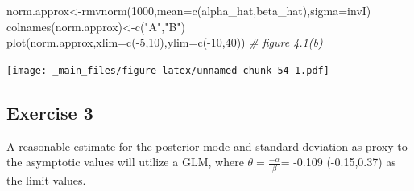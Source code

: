 \documentclass[
]{book}
\newenvironment{Shaded}{\begin{snugshade}}{\end{snugshade}}
\newcommand{\AttributeTok}[1]{\textcolor[rgb]{0.77,0.63,0.00}{#1}}
\newcommand{\CommentTok}[1]{\textcolor[rgb]{0.56,0.35,0.01}{\textit{#1}}}
\newcommand{\DecValTok}[1]{\textcolor[rgb]{0.00,0.00,0.81}{#1}}
\newcommand{\FunctionTok}[1]{\textcolor[rgb]{0.00,0.00,0.00}{#1}}
\newcommand{\NormalTok}[1]{#1}
\newcommand{\OtherTok}[1]{\textcolor[rgb]{0.56,0.35,0.01}{#1}}
\newcommand{\SpecialCharTok}[1]{\textcolor[rgb]{0.00,0.00,0.00}{#1}}
\newcommand{\StringTok}[1]{\textcolor[rgb]{0.31,0.60,0.02}{#1}}
\theoremstyle{definition}
\theoremstyle{definition}
\theoremstyle{definition}
\theoremstyle{definition}
\theoremstyle{remark}
\begin{document}
\begin{Shaded}
\begin{Highlighting}[]
\NormalTok{norm.approx}\OtherTok{\textless{}{-}}\FunctionTok{rmvnorm}\NormalTok{(}\DecValTok{1000}\NormalTok{,}\AttributeTok{mean=}\FunctionTok{c}\NormalTok{(alpha\_hat,beta\_hat),}\AttributeTok{sigma=}\NormalTok{invI)}
 \FunctionTok{colnames}\NormalTok{(norm.approx)}\OtherTok{\textless{}{-}}\FunctionTok{c}\NormalTok{(}\StringTok{"A"}\NormalTok{,}\StringTok{"B"}\NormalTok{)}
\FunctionTok{plot}\NormalTok{(norm.approx,}\AttributeTok{xlim=}\FunctionTok{c}\NormalTok{(}\SpecialCharTok{{-}}\DecValTok{5}\NormalTok{,}\DecValTok{10}\NormalTok{),}\AttributeTok{ylim=}\FunctionTok{c}\NormalTok{(}\SpecialCharTok{{-}}\DecValTok{10}\NormalTok{,}\DecValTok{40}\NormalTok{)) }\CommentTok{\# figure 4.1(b) }
\end{Highlighting}
\end{Shaded}

\texttt{[image: \_main\_files/figure-latex/unnamed-chunk-54-1.pdf]}

\hypertarget{exercise-3}{%
\subsection*{Exercise 3}\label{exercise-3}}

A reasonable estimate for the posterior mode and standard deviation as proxy to the asymptotic values will utilize a GLM, where \(\theta= \frac{-\alpha}{\beta}\)= -0.109 (-0.15,0.37) as the limit values.
\end{document}
